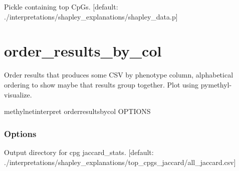 \documentclass[letterpaper,10pt,english]{sphinxmanual}
\begin{document}
\begin{fulllineitems}
\label{\detokenize{index:cmdoption-methylnet-interpret-list-individuals-s}}
Pickle containing top CpGs.  {[}default: ./interpretations/shapley\_explanations/shapley\_data.p{]}

\end{fulllineitems}



\section{order\_results\_by\_col}
\label{\detokenize{index:methylnet-interpret-order-results-by-col}}
Order results that produces some CSV by phenotype column, alphabetical ordering to show maybe that results group together. Plot using pymethyl-visualize.

\begin{sphinxVerbatim}[commandchars=\\\{\}]
methylnet\PYGZhy{}interpret order\PYGZus{}results\PYGZus{}by\PYGZus{}col \PYG{o}{[}OPTIONS\PYG{o}{]}
\end{sphinxVerbatim}
\subsubsection*{Options}

\begin{fulllineitems}
\label{\detokenize{index:cmdoption-methylnet-interpret-order-results-by-col-i}}
Output directory for cpg jaccard\_stats.  {[}default: ./interpretations/shapley\_explanations/top\_cpgs\_jaccard/all\_jaccard.csv{]}

\end{fulllineitems}
\end{document}
